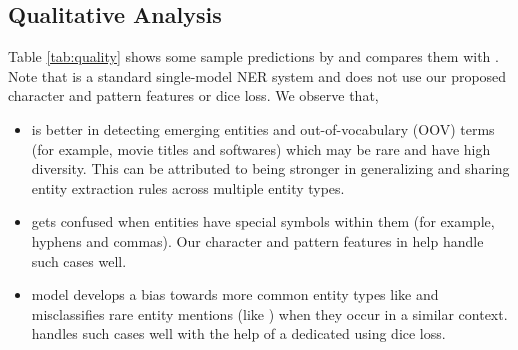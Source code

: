 \subsection{Qualitative Analysis}
Table \ref{tab:quality} shows some sample predictions by \modelname{} and compares them  with . Note that  is a standard single-model NER system and does not use our proposed character and pattern features or dice loss. We observe that,
\begin{itemize}
    \item \modelname{} is better in detecting emerging entities and out-of-vocabulary (OOV) terms (for example, movie titles and softwares) which may be rare and have high diversity. This can be attributed to \spandetect{} being stronger in generalizing and sharing entity extraction rules across multiple entity types.
    
    \item {} gets confused when entities have special symbols within them (for example, hyphens and commas). Our character and pattern features in \spandetect{} help handle such cases well.
    
    \item {} model develops a bias towards more common entity types like  and misclassifies rare entity mentions (like ) when they occur in a similar context. \modelname{} handles such cases well with the help of a dedicated \spanclass{} using dice loss.
\end{itemize}

